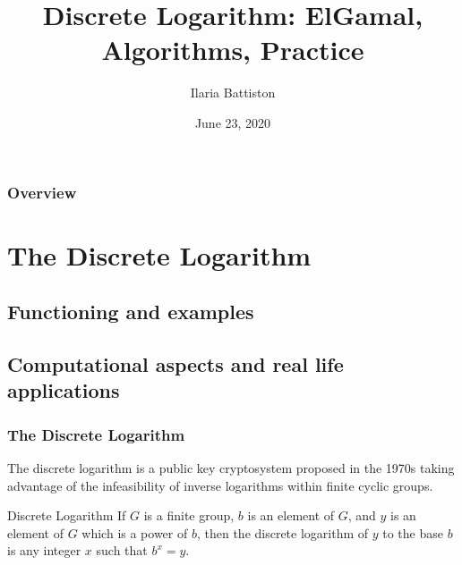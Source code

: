 \documentclass{beamer}
\title[Discrete Logarithm]{Discrete Logarithm: ElGamal, Algorithms, Practice} %
\author{Ilaria Battiston} %
\institute[TUM] %
{
Technical University Munich \\ %
\medskip
\textit{i.battiston@tum.de} %
}
\date{June 23, 2020} %
\begin{document}
\begin{frame}
\titlepage %
\end{frame}

\begin{frame}
\frametitle{Overview} %
\begin{minipage}{4in}
    \tableofcontents
  \end{minipage} %
\end{frame}


\section{The Discrete Logarithm} %
\subsection{Functioning and examples} %
\subsection{Computational aspects and real life applications}

\begin{frame}
\frametitle{The Discrete Logarithm}
The discrete logarithm is a public key cryptosystem proposed in the 1970s taking advantage of the infeasibility of inverse logarithms within finite cyclic groups.
\bigskip
\begin{block}{Discrete Logarithm}
If $G$ is a finite group, $b$ is an element of $G$, and $y$ is an element of $G$ which is a power of $b$, then the discrete logarithm of $y$ to the base $b$ is any integer $x$ such that $b^x = y$.
\end{block}

\end{frame}
\end{document}
